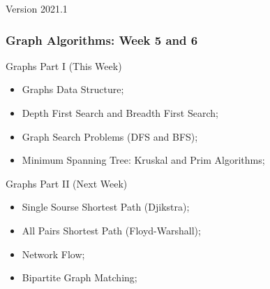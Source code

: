\documentclass[aspectratio=169]{beamer}
\subtitle[Week 5: Graph I]{Week 5 - Graph Part I: Basics}
\date[]{{\smaller(last updated: \today)}}
\begin{document}
\begin{CJK}{UTF8}{ipxm}

\begin{frame}
\maketitle
\vfill

\hfill Version 2021.1
\end{frame}

\begin{frame}
  \frametitle{Graph Algorithms: Week 5 and 6}
  \begin{block}{Graphs Part I (This Week)}
    \begin{itemize}
    \item Graphs Data Structure;
    \item Depth First Search and Breadth First Search;
    \item Graph Search Problems (DFS and BFS);
    \item Minimum Spanning Tree: Kruskal and Prim Algorithms;
    \end{itemize}
  \end{block}
  \begin{block}{Graphs Part II (Next Week)}
    \begin{itemize}
    \item Single Sourse Shortest Path (Djikstra);
    \item All Pairs Shortest Path (Floyd-Warshall);
    \item Network Flow;
    \item Bipartite Graph Matching;
    \end{itemize}
  \end{block}
\end{frame}





\end{CJK}
\end{document}
